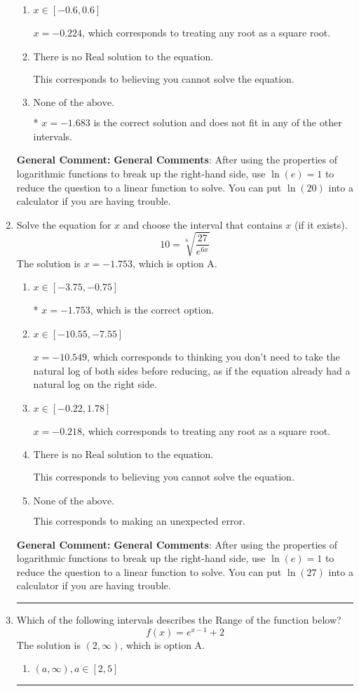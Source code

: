 \documentclass{extbook}[14pt]
\newcommand{\litem}[1]{\item #1

\rule{\textwidth}{0.4pt}}
\begin{document}
\begin{enumerate}
{\begin{enumerate}[label=\Alph*.]
$x = 1.683$, which is the negative of the correct solution.
\item \( x \in [-0.6, 0.6] \)

$x = -0.224$, which corresponds to treating any root as a square root.
\item \( \text{There is no Real solution to the equation.} \)

This corresponds to believing you cannot solve the equation.
\item \( \text{None of the above.} \)

* $x = -1.683$ is the correct solution and does not fit in any of the other intervals.
\end{enumerate}

\textbf{General Comment:} \textbf{General Comments}: After using the properties of logarithmic functions to break up the right-hand side, use $\ln(e) = 1$ to reduce the question to a linear function to solve. You can put $\ln(20)$ into a calculator if you are having trouble.
}
\litem{
 Solve the equation for $x$ and choose the interval that contains $x$ (if it exists).
\[  10 = \sqrt[6]{\frac{27}{e^{6x}}} \]The solution is \( x = -1.753 \), which is option A.\begin{enumerate}[label=\Alph*.]
\item \( x \in [-3.75, -0.75] \)

* $x = -1.753$, which is the correct option.
\item \( x \in [-10.55, -7.55] \)

$x = -10.549$, which corresponds to thinking you don't need to take the natural log of both sides before reducing, as if the equation already had a natural log on the right side.
\item \( x \in [-0.22, 1.78] \)

$x = -0.218$, which corresponds to treating any root as a square root.
\item \( \text{There is no Real solution to the equation.} \)

This corresponds to believing you cannot solve the equation.
\item \( \text{None of the above.} \)

This corresponds to making an unexpected error.
\end{enumerate}

\textbf{General Comment:} \textbf{General Comments}: After using the properties of logarithmic functions to break up the right-hand side, use $\ln(e) = 1$ to reduce the question to a linear function to solve. You can put $\ln(27)$ into a calculator if you are having trouble.
}
\litem{
Which of the following intervals describes the Range of the function below?
\[ f(x) = e^{x-1}+2 \]The solution is \( (2, \infty) \), which is option A.\begin{enumerate}[label=\Alph*.]
\item \( (a, \infty), a \in [2, 5] \)


\end{enumerate}}
\end{enumerate}
\end{document}
